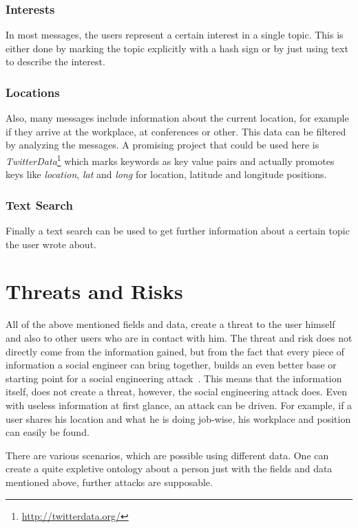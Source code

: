 \subsubsection{Interests}

In most messages, the users represent a certain interest in a single topic.
This is either done by marking the topic explicitly with a hash sign or by just
using text to describe the interest. 

\subsubsection{Locations}

Also, many messages include information about the current location, for example
if they arrive at the workplace, at conferences or other. This data can be
filtered by analyzing the messages. A promising project that could be used
here is \textit{TwitterData}\footnote{\url{http://twitterdata.org/}} which
marks keywords as key value pairs and actually promotes keys like
\textit{location}, \textit{lat} and \textit{long} for location, latitude and longitude
positions.

\subsubsection{Text Search}

Finally a text search can be used to get further information about a certain
topic the user wrote about. 

\section{Threats and Risks}

All of the above mentioned fields and data, create a threat to the user himself
and also to other users who are in contact with him. The threat and risk does
not directly come from the information gained, but from the fact that every
piece of information a social engineer can bring together, builds an even
better base or starting point for a social engineering
attack~\cite{mitnick2003}. This means that the information itself, does not
create a threat, however, the social engineering attack does. Even with useless
information at first glance, an attack can be driven. For example, if a user
shares his location and what he is doing job-wise, his workplace and position
can easily be found.

There are various scenarios, which are possible using different data. One can
create a quite expletive ontology about a person just with the fields and data
mentioned above, further attacks are supposable.

